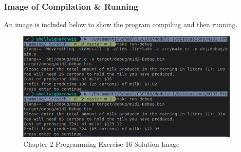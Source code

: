\documentclass[a4paper, 11pt]{article}
\begin{document}
      \subsubsection{Image of Compilation \& Running}
        An image is included below to show the program compiling and then
          running.
        \begin{figure}[H]
          \centering
          \caption{Chapter 2 Programming Exercise 16 Solution Image}
          \label{lst:soln}
          \includegraphics[width=\textwidth]{compandrun.png}
        \end{figure}

  \newpage
  \printbibliography[%
    heading=bibintoc,%
    title={Works Consulted}%
  ]
\end{document}
